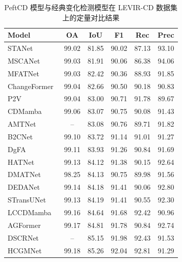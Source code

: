 \begin{table}[!htb]
\centering
\caption{PeftCD 模型与经典变化检测模型在 LEVIR-CD 数据集上的定量对比结果}
\label{tab:peftcd_levir}
\begin{tabular}{l c c c c c}
\toprule
\textbf{Model} & \textbf{OA} & \textbf{IoU} & \textbf{F1} & \textbf{Rec} & \textbf{Prec} \\
\midrule
    STANet~\cite{chen_spatial-temporal_2020}   & 99.02 & 81.85 & 90.02 & 87.13 & 93.10 \\
    MSCANet~\cite{m_liu_cnn-transformer_2022}          &  99.03 &  81.91 &  90.06 &  86.38 &  94.06  \\
    MFATNet~\cite{Mao2022MFATNetMF}          &  99.03 &  82.42 &  90.36 &  88.93 &  91.85  \\
    ChangeFormer~\cite{bandara2022transformer}     &  99.04 &  82.66 &  90.50 &  90.18 &  90.83  \\
    P2V~\cite{lin_transition_2023}              &  99.04 &  83.00 &  90.71 &  91.78 &  89.67  \\
    CDMamba~\cite{zhang_cdmamba_2025}          &  99.06 &  83.07 &  90.75 &  90.08 &  91.43  \\
    AMTNet~\cite{Liu2023AnAM}           &   --   &  83.08 &  90.76 &  89.71 &  91.82  \\
    B2CNet~\cite{Zhang2024B2CNetAP} & 99.10 & 83.72 & 91.14 & 91.01 & 91.27 \\
    DgFA~\cite{f_zhou_dual-granularity_2025}   & 99.11 & 83.93 & 91.26 & 90.84 & 91.69 \\
    HATNet~\cite{Xu2024HybridAT} & 99.13 & 84.12 & 91.38 & 90.15 & 92.64 \\
    DMATNet~\cite{Song2022RemoteSI}          &  98.25 &  84.13 &  90.75 &  89.98 &  91.56  \\
    DEDANet~\cite{Li2025DifferenceEA}          &  99.14 &  84.18 &  91.41 &  90.06 &  92.80  \\
    STransUNet~\cite{Yuan2022STransUNetAS}       &  99.13 &  84.19 &  91.41 &  90.55 &  92.30  \\
    LCCDMamba~\cite{Huang2025LCCDMambaVS}       &  99.16 &  84.64 &  91.68 &  92.42 &  90.96  \\
    AGFormer~\cite{Chen2025AGFormerAA}         &  99.17 &  84.81 &  91.78 &  90.84 &  92.74  \\
    DSCRNet~\cite{Zhang2025ADS}         &  -- &  85.15 &  91.98 &  92.43 &  91.53  \\
    HCGMNet~\cite{Han2023HCGMNetAH}          &  99.18 &  85.26 &  92.04 &  92.81 &  91.29  \\

\end{tabular}
\end{table}

